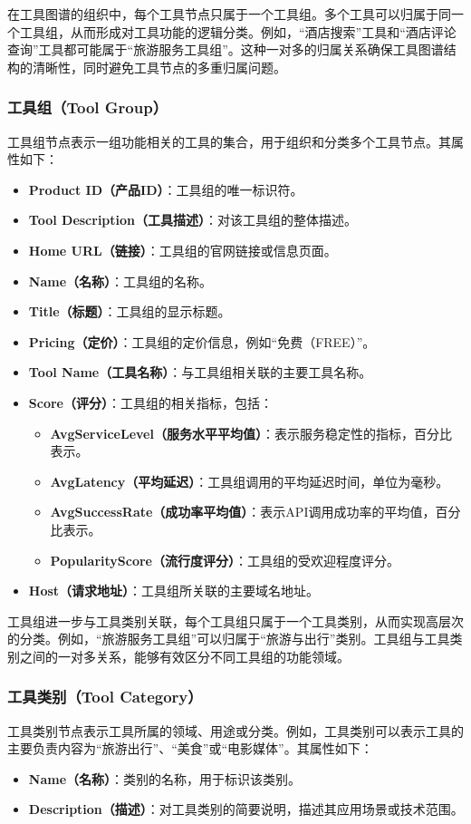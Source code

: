 在工具图谱的组织中，每个工具节点只属于一个工具组。多个工具可以归属于同一个工具组，从而形成对工具功能的逻辑分类。例如，“酒店搜索”工具和“酒店评论查询”工具都可能属于“旅游服务工具组”。这种一对多的归属关系确保工具图谱结构的清晰性，同时避免工具节点的多重归属问题。

\subsubsection{工具组（Tool Group）}
工具组节点表示一组功能相关的工具的集合，用于组织和分类多个工具节点。其属性如下：
\begin{itemize}
    \item \textbf{Product ID（产品ID）}：工具组的唯一标识符。
    \item \textbf{Tool Description（工具描述）}：对该工具组的整体描述。
    \item \textbf{Home URL（链接）}：工具组的官网链接或信息页面。
    \item \textbf{Name（名称）}：工具组的名称。
    \item \textbf{Title（标题）}：工具组的显示标题。
    \item \textbf{Pricing（定价）}：工具组的定价信息，例如``免费（FREE）''。
    \item \textbf{Tool Name（工具名称）}：与工具组相关联的主要工具名称。
    \item \textbf{Score（评分）}：工具组的相关指标，包括：
        \begin{itemize}
            \item \textbf{AvgServiceLevel（服务水平平均值）}：表示服务稳定性的指标，百分比表示。
            \item \textbf{AvgLatency（平均延迟）}：工具组调用的平均延迟时间，单位为毫秒。
            \item \textbf{AvgSuccessRate（成功率平均值）}：表示API调用成功率的平均值，百分比表示。
            \item \textbf{PopularityScore（流行度评分）}：工具组的受欢迎程度评分。
        \end{itemize}
    \item \textbf{Host（请求地址）}：工具组所关联的主要域名地址。
\end{itemize}

工具组进一步与工具类别关联，每个工具组只属于一个工具类别，从而实现高层次的分类。例如，“旅游服务工具组”可以归属于“旅游与出行”类别。工具组与工具类别之间的一对多关系，能够有效区分不同工具组的功能领域。


\subsubsection{工具类别（Tool Category）}
工具类别节点表示工具所属的领域、用途或分类。例如，工具类别可以表示工具的主要负责内容为“旅游出行”、“美食”或“电影媒体”。其属性如下：
\begin{itemize}
    \item \textbf{Name（名称）}：类别的名称，用于标识该类别。
    \item \textbf{Description（描述）}：对工具类别的简要说明，描述其应用场景或技术范围。
\end{itemize}

